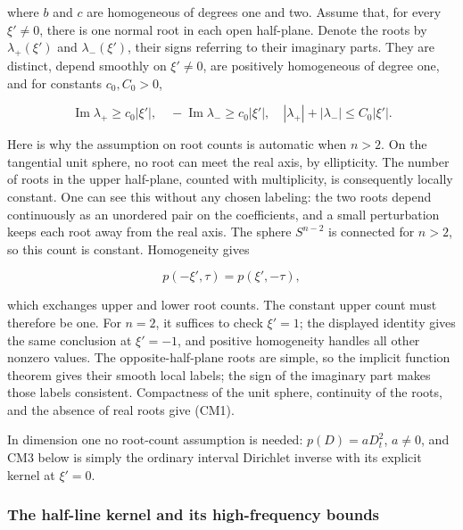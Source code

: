 \documentclass[
  11pt,
]{article}
\makeatletter
\let\ReaderOriginalAnchorStart\hyper@anchorstart
\let\ReaderOriginalAnchorEnd\hyper@anchorend
\let\ReaderPendingAliases\@empty
\def\ReaderArmAliases#1{\gdef\ReaderPendingAliases{#1}}
\def\hyper@anchorstart#1{\ReaderIfNativeAnchorTF{#1}{\ReaderPendingAliases\global\let\ReaderPendingAliases\@empty}{}\ReaderOriginalAnchorStart{#1}}
\makeatother
\begin{document}
where \(b\) and \(c\) are homogeneous of degrees one and two. Assume
that, for every \(\xi'\ne0\), there is one normal root in each open
half-plane. Denote the roots by \(\lambda_+(\xi')\) and
\(\lambda_-(\xi')\), their signs referring to their imaginary parts.
They are distinct, depend smoothly on \(\xi'\ne0\), are positively
homogeneous of degree one, and for constants \(c_0,C_0>0\),

\[
\operatorname{Im}\lambda_+\geq c_0|\xi'|,
\quad-\operatorname{Im}\lambda_-\geq c_0|\xi'|,
\quad |\lambda_+|+|\lambda_-|\leq C_0|\xi'|.
\tag{CM1}
\]

Here is why the assumption on root counts is automatic when \(n>2\). On
the tangential unit sphere, no root can meet the real axis, by
ellipticity. The number of roots in the upper half-plane, counted with
multiplicity, is consequently locally constant. One can see this without
any chosen labeling: the two roots depend continuously as an unordered
pair on the coefficients, and a small perturbation keeps each root away
from the real axis. The sphere \(S^{n-2}\) is connected for \(n>2\), so
this count is constant. Homogeneity gives

\[
p(-\xi',\tau)=p(\xi',-\tau),
\]

which exchanges upper and lower root counts. The constant upper count
must therefore be one. For \(n=2\), it suffices to check \(\xi'=1\); the
displayed identity gives the same conclusion at \(\xi'=-1\), and
positive homogeneity handles all other nonzero values. The
opposite-half-plane roots are simple, so the implicit function theorem
gives their smooth local labels; the sign of the imaginary part makes
those labels consistent. Compactness of the unit sphere, continuity of
the roots, and the absence of real roots give (CM1).

In dimension one no root-count assumption is needed: \(p(D)=aD_t^2\),
\(a\ne0\), and CM3 below is simply the ordinary interval Dirichlet
inverse with its explicit kernel at \(\xi'=0\).

\ReaderArmAliases{\ReaderOriginalAnchorStart{cm2-the-half-line-kernel-and-its-high-frequency-bounds}\ReaderOriginalAnchorEnd\begingroup\expandafter\def\csname @currentHref\endcsname{cm2-the-half-line-kernel-and-its-high-frequency-bounds}\label{cm2-the-half-line-kernel-and-its-high-frequency-bounds}\endgroup\ReaderOriginalAnchorStart{the-half-line-kernel-and-its-high-frequency-bounds}\ReaderOriginalAnchorEnd}
\subsubsection{The half-line kernel and its high-frequency
bounds}\label{the-half-line-kernel-and-its-high-frequency-bounds}
\end{document}

